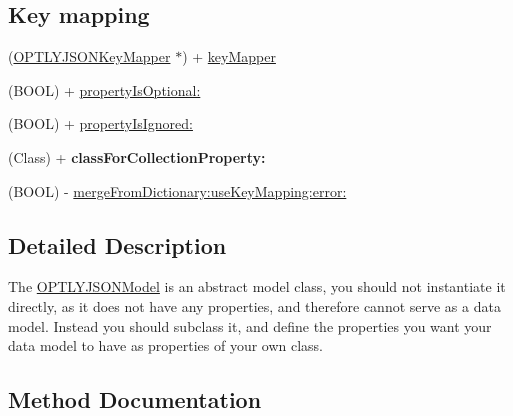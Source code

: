\subsection*{Key mapping}
\begin{DoxyCompactItemize}
\item 
(\mbox{\hyperlink{interface_o_p_t_l_y_j_s_o_n_key_mapper}{O\+P\+T\+L\+Y\+J\+S\+O\+N\+Key\+Mapper}} $\ast$) + \mbox{\hyperlink{interface_o_p_t_l_y_j_s_o_n_model_a9acd086d25e51329aea4858803fe4098}{key\+Mapper}}
\item 
(B\+O\+OL) + \mbox{\hyperlink{interface_o_p_t_l_y_j_s_o_n_model_afaf77fcb6d2307217a858c764df3ae75}{property\+Is\+Optional\+:}}
\item 
(B\+O\+OL) + \mbox{\hyperlink{interface_o_p_t_l_y_j_s_o_n_model_a49b04a9bf083b74205921a22b5521ef6}{property\+Is\+Ignored\+:}}
\item 
\mbox{\label{interface_o_p_t_l_y_j_s_o_n_model_a79852a1652daab78edcad1d1c5c46953}} 
(Class) + {\bfseries class\+For\+Collection\+Property\+:}
\item 
(B\+O\+OL) -\/ \mbox{\hyperlink{interface_o_p_t_l_y_j_s_o_n_model_a892d35a66375282061bec1305ff48446}{merge\+From\+Dictionary\+:use\+Key\+Mapping\+:error\+:}}
\end{DoxyCompactItemize}


\subsection{Detailed Description}
The \mbox{\hyperlink{interface_o_p_t_l_y_j_s_o_n_model}{O\+P\+T\+L\+Y\+J\+S\+O\+N\+Model}} is an abstract model class, you should not instantiate it directly, as it does not have any properties, and therefore cannot serve as a data model. Instead you should subclass it, and define the properties you want your data model to have as properties of your own class. 

\subsection{Method Documentation}
\mbox{\label{interface_o_p_t_l_y_j_s_o_n_model_a6094627ef7b6ea29638aa744cf529090}} 
